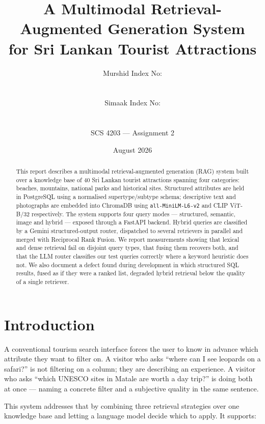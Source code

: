 \documentclass[11pt,a4paper]{article}
\title{\vspace{-1.5cm}\textbf{A Multimodal Retrieval-Augmented Generation System\\
for Sri Lankan Tourist Attractions}}
\author{%
  Murshid \quad\textbar\quad Index No: \rule{2.5cm}{0.4pt}\\[2pt]
  Simaak \quad\textbar\quad Index No: \rule{2.5cm}{0.4pt}\\[6pt]
  \normalsize SCS 4203 --- Assignment 2
}
\date{August 2026}
\begin{document}
\maketitle

\begin{abstract}
\noindent
This report describes a multimodal retrieval-augmented generation (RAG) system
built over a knowledge base of 40 Sri Lankan tourist attractions spanning four
categories: beaches, mountains, national parks and historical sites. Structured
attributes are held in PostgreSQL using a normalised supertype/subtype schema;
descriptive text and photographs are embedded into ChromaDB using
\texttt{all-MiniLM-L6-v2} and CLIP ViT-B/32 respectively. The system supports
four query modes --- structured, semantic, image and hybrid --- exposed through
a FastAPI backend. Hybrid queries are classified by a Gemini structured-output
router, dispatched to several retrievers in parallel and merged with Reciprocal
Rank Fusion. We report measurements showing that lexical and dense retrieval
fail on disjoint query types, that fusing them recovers both, and that the
LLM router classifies our test queries correctly where a keyword heuristic does
not. We also document a defect found during development in which structured SQL
results, fused as if they were a ranked list, degraded hybrid retrieval below
the quality of a single retriever.
\end{abstract}

\tableofcontents
\newpage

\section{Introduction}

A conventional tourism search interface forces the user to know in advance which
attribute they want to filter on. A visitor who asks ``where can I see leopards
on a safari?'' is not filtering on a column; they are describing an experience.
A visitor who asks ``which UNESCO sites in Matale are worth a day trip?'' is
doing both at once --- naming a concrete filter and a subjective quality in the
same sentence.

This system addresses that by combining three retrieval strategies over one
knowledge base and letting a language model decide which to apply. It supports:
\end{document}
